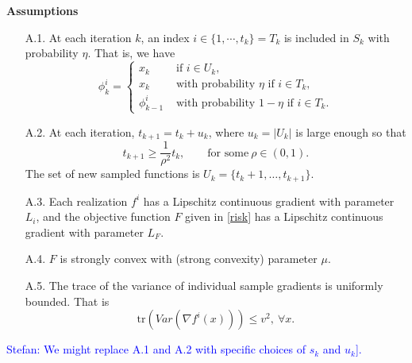 \documentclass[11pt]{article}
\begin{document}
\noindent\textbf{Assumptions}

\begin{itemize}
 \item[A.1.] At each iteration $k$, an index $i\in \{1,\cdots, t_k\}=T_k$ is included in $S_k$ with probability $\eta$.  That is,  we have
\[
\phi_{k}^i= 
 \begin{cases}
   x_k &\mbox{ if } i\in U_k, \\
   x_k  &\mbox{ with probability }\eta \mbox{ if } i \in T_k,\\
   \phi_{k-1}^i & \mbox{ with probability }1-\eta \mbox{ if } i \in T_k.
 \end{cases}
\]

 \item[A.2.] At each iteration, $t_{k+1}= t_k+ u_k$, where $u_k= | U_k |$ is large enough so that
 \begin{equation}   \label{Igrowth}
 t_{k+1} \geq \frac{1}{\rho^2} t_k , \qquad\mbox{for some} \  \rho \in( 0,1).
 \end{equation}
 The set of new sampled functions is $U_k =\{t_k+1, \ldots, t_{k+1} \}$.


 
 \item[A.3.] Each realization $f^i$ has a Lipschitz continuous gradient with parameter $L_i$, and  the objective function $F$ given in \eqref{risk} has a Lipschitz continuous gradient with parameter $L_F$.  

 \item[A.4.] $F$ is strongly convex with (strong convexity) parameter $\mu$.
 
 \item[A.5.] The trace of the variance of individual sample gradients is uniformly bounded.  That is
 \[
   \mbox{tr}(Var(\nabla f^i(x))) \leq v^2, \ \forall x.
 \]

\end{itemize}


 \bigskip
  \textcolor{blue}{Stefan: We might replace A.1 and A.2 with specific choices of $s_k$ and $u_k$].}
\end{document}
